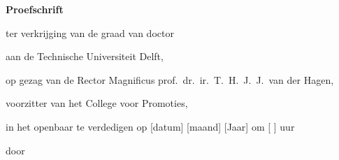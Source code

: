 \begin{titlepage}

\begin{center}

\vspace*{2\bigskipamount}

{\makeatletter
\titlestyle\singlespacing\bfseries\LARGE\@title\par
\makeatother}

{\makeatletter
\ifx\@subtitle\undefined\else
    \bigskip
    \titlefont\titleshape\Large\@subtitle
\fi
\makeatother}

\end{center}

\cleardoublepage
\thispagestyle{empty}

\begin{center}


\vspace*{2\bigskipamount}

{\makeatletter
\titlestyle\singlespacing\bfseries\LARGE\@title\par
\makeatother}

{\makeatletter
\ifx\@subtitle\undefined\else
    \bigskip
    \titlefont\titleshape\Large\@subtitle
\fi
\makeatother}


\vfill


{\Large\titlefont\bfseries Proefschrift}

\bigskip
\bigskip

ter verkrijging van de graad van doctor

aan de Technische Universiteit Delft,

op gezag van de Rector Magnificus prof.~dr.~ir.~T.~H.~J.~J.~van der Hagen,

voorzitter van het College voor Promoties,

in het openbaar te verdedigen op [datum] [maand] [Jaar] om [ ] uur

\bigskip
\bigskip

door

\bigskip
\bigskip


\end{center}
\end{titlepage}
